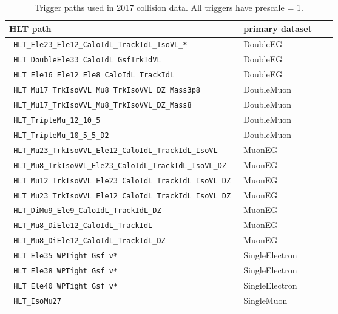 \begin{table*}
  \caption{Trigger paths used in 2017 collision data. All triggers have prescale = 1.}
  \label{tab:trigpat2017}
  \scriptsize
  \centering  
  \begin{tabular}{|l|l|c|l|} 
    \hline %
    HLT path                                                    & primary dataset \\
    \hline %
    \verb| HLT_Ele23_Ele12_CaloIdL_TrackIdL_IsoVL_*           | & DoubleEG \\
    \verb| HLT_DoubleEle33_CaloIdL_GsfTrkIdVL                 | & DoubleEG \\
    \verb| HLT_Ele16_Ele12_Ele8_CaloIdL_TrackIdL              | & DoubleEG \\
    \verb| HLT_Mu17_TrkIsoVVL_Mu8_TrkIsoVVL_DZ_Mass3p8        | & DoubleMuon \\
    \verb| HLT_Mu17_TrkIsoVVL_Mu8_TrkIsoVVL_DZ_Mass8          | & DoubleMuon \\
    \verb| HLT_TripleMu_12_10_5                               | & DoubleMuon \\
    \verb| HLT_TripleMu_10_5_5_D2                             | & DoubleMuon \\
    \verb| HLT_Mu23_TrkIsoVVL_Ele12_CaloIdL_TrackIdL_IsoVL    | & MuonEG \\
    \verb| HLT_Mu8_TrkIsoVVL_Ele23_CaloIdL_TrackIdL_IsoVL_DZ  | & MuonEG \\
    \verb| HLT_Mu12_TrkIsoVVL_Ele23_CaloIdL_TrackIdL_IsoVL_DZ | & MuonEG \\
    \verb| HLT_Mu23_TrkIsoVVL_Ele12_CaloIdL_TrackIdL_IsoVL_DZ | & MuonEG \\
    \verb| HLT_DiMu9_Ele9_CaloIdL_TrackIdL_DZ                 | & MuonEG \\
    \verb| HLT_Mu8_DiEle12_CaloIdL_TrackIdL                   | & MuonEG \\
    \verb| HLT_Mu8_DiEle12_CaloIdL_TrackIdL_DZ                | & MuonEG \\
    \verb| HLT_Ele35_WPTight_Gsf_v*                           | & SingleElectron \\
    \verb| HLT_Ele38_WPTight_Gsf_v*                           | & SingleElectron \\
    \verb| HLT_Ele40_WPTight_Gsf_v*                           | & SingleElectron \\
    \verb| HLT_IsoMu27                                        | & SingleMuon \\
    \hline %
  \end{tabular}
\end{table*}


